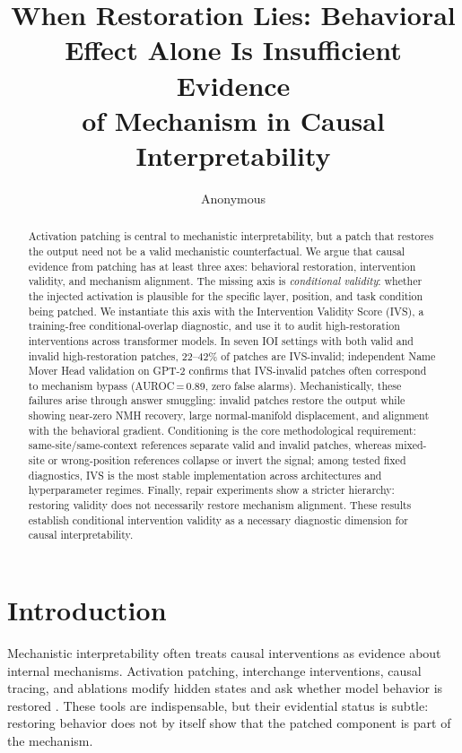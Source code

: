 \documentclass{article}
\title{When Restoration Lies: Behavioral Effect Alone Is Insufficient Evidence \\
of Mechanism in Causal Interpretability}
\author{Anonymous}
\begin{document}
\maketitle

\begin{abstract}
Activation patching is central to mechanistic interpretability, but a patch that restores the output need not be a valid mechanistic counterfactual. We argue that causal evidence from patching has at least three axes: behavioral restoration, intervention validity, and mechanism alignment. The missing axis is \emph{conditional validity}: whether the injected activation is plausible for the specific layer, position, and task condition being patched. We instantiate this axis with the Intervention Validity Score (IVS), a training-free conditional-overlap diagnostic, and use it to audit high-restoration interventions across transformer models. In seven IOI settings with both valid and invalid high-restoration patches, 22--42\% of patches are IVS-invalid; independent Name Mover Head validation on GPT-2 confirms that IVS-invalid patches often correspond to mechanism bypass (AUROC\,=\,0.89, zero false alarms). Mechanistically, these failures arise through answer smuggling: invalid patches restore the output while showing near-zero NMH recovery, large normal-manifold displacement, and alignment with the behavioral gradient. Conditioning is the core methodological requirement: same-site/same-context references separate valid and invalid patches, whereas mixed-site or wrong-position references collapse or invert the signal; among tested fixed diagnostics, IVS is the most stable implementation across architectures and hyperparameter regimes. Finally, repair experiments show a stricter hierarchy: restoring validity does not necessarily restore mechanism alignment. These results establish conditional intervention validity as a necessary diagnostic dimension for causal interpretability.
\end{abstract}

\section{Introduction}
\label{sec:intro}

Mechanistic interpretability often treats causal interventions as evidence about internal mechanisms. Activation patching, interchange interventions, causal tracing, and ablations modify hidden states and ask whether model behavior is restored \citep{vig2020investigating,meng2022locating,wang2022interpretability,geiger2024finding}. These tools are indispensable, but their evidential status is subtle: restoring behavior does not by itself show that the patched component is part of the mechanism.
\end{document}
